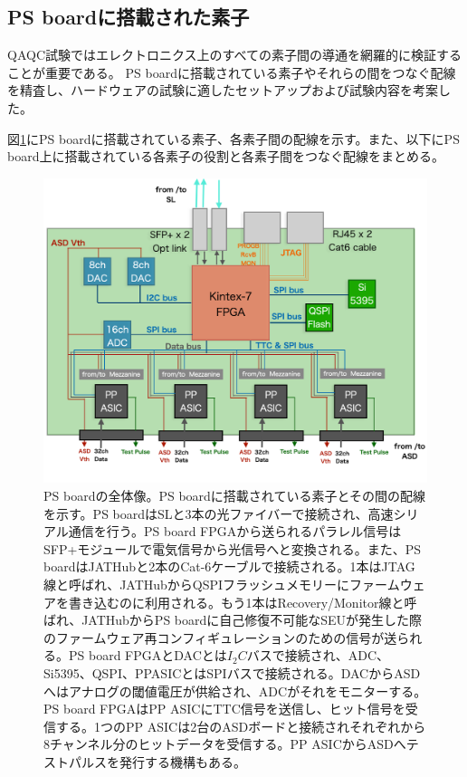 \newpage
\subsection{PS boardに搭載された素子}
\label{subsec_PSBelements}
QAQC試験ではエレクトロニクス上のすべての素子間の導通を網羅的に検証することが重要である。
PS boardに搭載されている素子やそれらの間をつなぐ配線を精査し、ハードウェアの試験に適したセットアップおよび試験内容を考案した。

図\ref{PSBconcept}にPS boardに搭載されている素子、各素子間の配線を示す。また、以下にPS board上に搭載されている各素子の役割と各素子間をつなぐ配線をまとめる。

\begin{figure} 
\centering
\includegraphics[width=16cm]{fig/QAQC/PSBoverall.png}
\caption[PS boardの全体像]{PS boardの全体像。PS boardに搭載されている素子とその間の配線を示す。PS boardはSLと3本の光ファイバーで接続され、高速シリアル通信を行う。PS board FPGAから送られるパラレル信号はSFP+モジュールで電気信号から光信号へと変換される。また、PS boardはJATHubと2本のCat-6ケーブルで接続される。1本はJTAG線と呼ばれ、JATHubからQSPIフラッシュメモリーにファームウェアを書き込むのに利用される。もう1本はRecovery/Monitor線と呼ばれ、JATHubからPS boardに自己修復不可能なSEUが発生した際のファームウェア再コンフィギュレーションのための信号が送られる。PS board FPGAとDACとは$I_{2}C$バスで接続され、ADC、Si5395、QSPI、PPASICとはSPIバスで接続される。DACからASDへはアナログの閾値電圧が供給され、ADCがそれをモニターする。PS board FPGAはPP ASICにTTC信号を送信し、ヒット信号を受信する。1つのPP ASICは2台のASDボードと接続されそれぞれから8チャンネル分のヒットデータを受信する。PP ASICからASDへテストパルスを発行する機構もある。}
\label{PSBconcept}
\end{figure}


